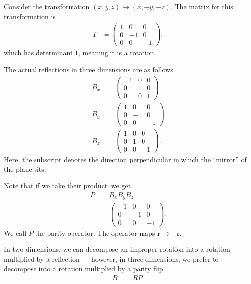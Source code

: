 \documentclass[10pt]{mypackage}
\begin{document}
\begin{example}
  Consider the transformation $\left(x,y,z\right) \mapsto \left(x,-y,-z\right)$. The matrix for this transformation is
  \begin{align*}
    T &= \begin{pmatrix}1 & 0 & 0 \\ 0 & -1 & 0 \\ 0 & 0 & -1\end{pmatrix},
  \end{align*}
  which has determinant $1$, meaning it is a rotation.\newline

  The actual reflections in three dimensions are as follows
  \begin{align*}
    B_x &= \begin{pmatrix}-1 & 0 & 0 \\ 0 & 1 & 0 \\ 0 & 0 & 1\end{pmatrix}\\
    B_y &= \begin{pmatrix}1 & 0 & 0 \\ 0 & -1 & 0 \\ 0 & 0 & -1\end{pmatrix}\\
    B_z &= \begin{pmatrix}1 & 0 & 0 \\ 0 & 1 & 0 \\ 0 & 0 & -1\end{pmatrix}.
  \end{align*}
  Here, the subscript denotes the direction perpendicular in which the ``mirror'' of the plane sits.\newline

  Note that if we take their product, we get
  \begin{align*}
    P &= B_xB_yB_z\\
      &= \begin{pmatrix}-1 & 0 & 0 \\ 0 & -1 & 0 \\ 0 & 0 & -1\end{pmatrix}.
  \end{align*}
  We call $P$ the parity operator. The operator maps $\mathbf{r} \mapsto -\mathbf{r}$.\newline

  In two dimensions, we can decompose an improper rotation into a rotation multiplied by a reflection --- however, in three dimensions, we prefer to decompose into a rotation multiplied by a parity flip.
  \begin{align*}
    B &= RP.
  \end{align*}
\end{example}
\end{document}
